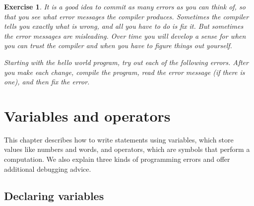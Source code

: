 \documentclass[12pt]{book}
\theoremstyle{exercise}
\newtheorem{exercise}{Exercise}[chapter]
\newcommand{\java}{\verb}%}
\begin{document}
\begin{exercise}

It is a good idea to commit as many errors as you can think of, so that you see what error messages the compiler produces.
Sometimes the compiler tells you exactly what is wrong, and all you have to do is fix it.
But sometimes the error messages are misleading.
Over time you will develop a sense for when you can trust the compiler and when you have to figure things out yourself.

Starting with the hello world program, try out each of the following errors.
After you make each change, compile the program, read the error message (if there is one), and then fix the error.


\end{exercise}


\chapter{Variables and operators}

This chapter describes how to write statements using variables, which store values like numbers and words, and operators, which are symbols that perform a computation.
We also explain three kinds of programming errors and offer additional debugging advice.


\section{Declaring variables}
\end{document}
